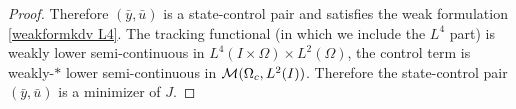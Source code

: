 \begin{proof}
Therefore $(\bar y, \bar u)$ is a state-control pair and satisfies the weak formulation \eqref{weakformkdv L4}. The tracking functional (in which we include the $L^4$ part) is weakly lower semi-continuous in $L^4(I\times \Omega)\times L^2(\Omega)$, the control term is weakly-$*$ lower semi-continuous in $\mathcal{M}(\Omega_c, L^{2}(I))$. Therefore the state-control pair $(\bar y, \bar u)$ is a minimizer of $J$.
\qquad\end{proof}
